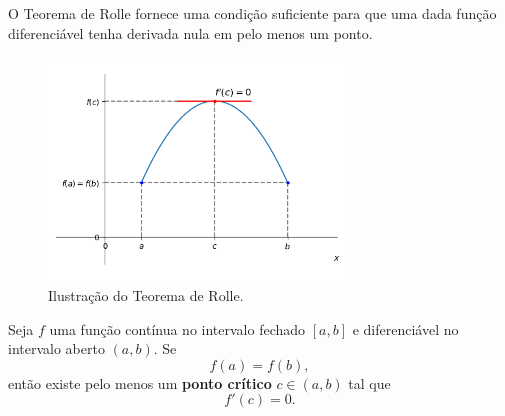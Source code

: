 O Teorema de Rolle fornece uma condição suficiente para que uma dada função diferenciável tenha derivada nula em pelo menos um ponto.

\begin{figure}[H]
  \centering
  \includegraphics[width=0.7\textwidth]{./cap_apderiv/dados/fig_teo_Rolle/fig_teo_Rolle}
  \caption{Ilustração do Teorema de Rolle.}
  \label{fig:teo_Rolle}
\end{figure}

\begin{teo}
  Seja $f$ uma função contínua no intervalo fechado $[a, b]$ e diferenciável no intervalo aberto $(a, b)$. Se
  \begin{equation}
    f(a)=f(b),
  \end{equation}
  então existe pelo menos um {\bf ponto crítico} $c\in (a, b)$ tal que
  \begin{equation}
    f'(c)=0.
  \end{equation}
\end{teo}

